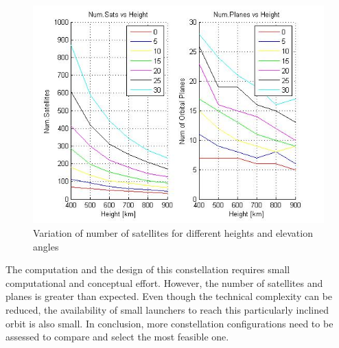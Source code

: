 \begin{figure}[H]
\begin{center}
\includegraphics[scale=0.6]{PolarOrbits/GeneralResults.jpg}
\caption{Variation of number of satellites for different heights and elevation angles}
\end{center}
\end{figure}

%

The computation and the design of this constellation requires small computational and conceptual effort. However, the number of satellites and planes is greater than expected. Even though the technical complexity can be reduced, the availability of small launchers to reach this particularly inclined orbit is also small. In conclusion, more constellation configurations need to be assessed to compare and select the most feasible one.

%
%